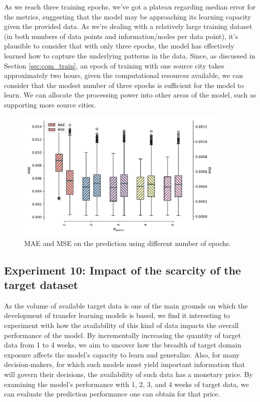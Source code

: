 As we reach three training epochs, we've got a plateau regarding median error for the metrics, suggesting that the model may be approaching its learning capacity given the provided data. As we're dealing with a relatively large training dataset (in both numbers of data points and information/nodes per data point), it's plausible to consider that with only three epochs, the model has effectively learned how to capture the underlying patterns in the data. Since, as discussed in Section \ref{sec:com_train}, an epoch of training with one source city takes approximately two hours, given the computational resources available, we can consider that the modest number of three epochs is sufficient for the model to learn. We can allocate the processing power into other areas of the model, such as supporting more source cities.

\begin{figure}[!ht]
\noindent\hspace{0.5mm}\includegraphics[width=0.9\textwidth]{./figures/exp09/boxplot.pdf}
\caption{\gls{MAE} and \gls{MSE} on the prediction using different number of epochs.}
\label{fig:exp09boxplot}
\end{figure}



\subsection{Experiment 10: Impact of the scarcity of the target dataset}

As the volume of available target data is one of the main grounds on which the development of transfer learning models is based, we find it interesting to experiment with how the availability of this kind of data impacts the overall performance of the model. By incrementally increasing the quantity of target data from 1 to 4 weeks, we aim to uncover how the breadth of target domain exposure affects the model's capacity to learn and generalize. Also, for many decision-makers, for which such models must yield important information that will govern their decisions, the availability of such data has a monetary price. By examining the model's performance with 1, 2, 3, and 4 weeks of target data, we can evaluate the prediction performance one can obtain for that price.



